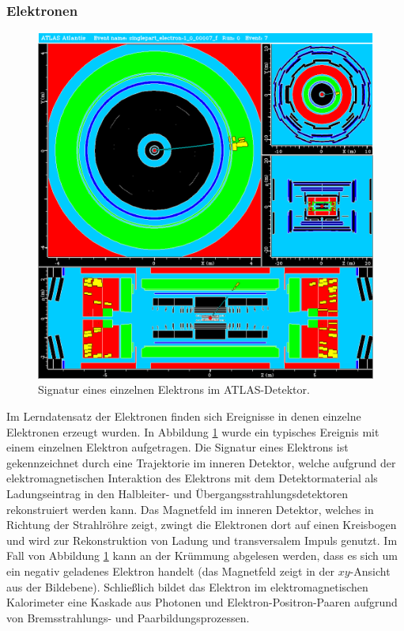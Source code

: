\documentclass[11pt, a4paper]{article}
\numberwithin{equation}{section}
\begin{document}
\subsubsection{Elektronen}
\begin{figure}[htbp]
	\centering
	\includegraphics[width=1.0\textwidth]{./data/atlantis/singlepart_events_new/electron/curvature.png}
	\caption{Signatur eines einzelnen Elektrons im ATLAS-Detektor.}
	\label{fig:electron-curvature}
\end{figure}
\vfill
\noindent
Im Lerndatensatz der Elektronen finden sich Ereignisse in denen einzelne Elektronen erzeugt wurden.
In Abbildung \ref{fig:electron-curvature} wurde ein typisches Ereignis mit einem einzelnen Elektron aufgetragen.
Die Signatur eines Elektrons ist gekennzeichnet durch eine Trajektorie im inneren Detektor, welche aufgrund der elektromagnetischen Interaktion des Elektrons mit dem Detektormaterial als Ladungseintrag in den Halbleiter- und Übergangsstrahlungsdetektoren rekonstruiert werden kann.
Das Magnetfeld im inneren Detektor, welches in Richtung der Strahlröhre zeigt, zwingt die Elektronen dort auf einen Kreisbogen und wird zur Rekonstruktion von Ladung und transversalem Impuls genutzt.
Im Fall von Abbildung \ref{fig:electron-curvature} kann an der Krümmung abgelesen werden, dass es sich um ein negativ geladenes Elektron handelt (das Magnetfeld zeigt in der $xy$-Ansicht aus der Bildebene).
Schließlich bildet das Elektron im elektromagnetischen Kalorimeter eine Kaskade aus Photonen und Elektron-Positron-Paaren aufgrund von Bremsstrahlungs- und Paarbildungsprozessen.
\vfill
\end{document}
